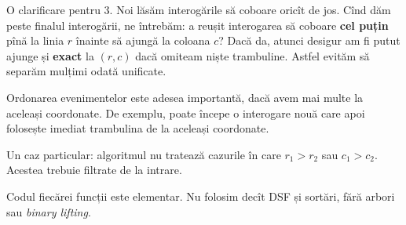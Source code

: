 \documentclass[../main.tex]{subfiles}
\begin{document}
O clarificare pentru 3. Noi lăsăm interogările să coboare oricît de jos. Cînd dăm peste finalul interogării, ne întrebăm: a reușit interogarea să coboare \textbf{cel puțin} pînă la linia $r$ înainte să ajungă la coloana $c$? Dacă da, atunci desigur am fi putut ajunge și \textbf{exact} la $(r,c)$ dacă omiteam niște trambuline. Astfel evităm să separăm mulțimi odată unificate.

Ordonarea evenimentelor este adesea importantă, dacă avem mai multe la aceleași coordonate. De exemplu, poate începe o interogare nouă care apoi folosește imediat trambulina de la aceleași coordonate.

Un caz particular: algoritmul nu tratează cazurile în care $r_1 > r_2$ sau $c_1 > c_2$. Acestea trebuie filtrate de la intrare.

Codul fiecărei funcții este elementar. Nu folosim decît DSF și sortări, fără arbori sau \textit{binary lifting}.
\end{document}
